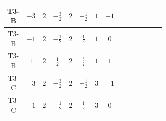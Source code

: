 \documentclass[8pt]{article}
\begin{document}
\begin{landscape}
\begin{longtable}{@{}cccccccc >{\raggedright\arraybackslash}p{0.21\linewidth} >{\raggedright\arraybackslash}p{0.21\linewidth} >{\raggedright\arraybackslash}p{0.21\linewidth}@{}}
\midrule
T3-B & $-3$ & $2$ & $-\frac{3}{2}$ & $2$ & $-\frac{1}{2}$ & $1$ & $-1$ & \scriptsize\adjustbox{max width=\linewidth}{$\begin{gathered} +D_{\mu _1}\left(S_{2,j_1}\right){}^{\dagger } D_{\mu _1}\left(S_{2,j_1}\right)\end{gathered}$} & \scriptsize\adjustbox{max width=\linewidth}{$\begin{gathered} -\frac{\hbar  B_{\mu _1\mu _2}^2}{\epsilon }\end{gathered}$} &  \\
\midrule
T3-B & $-1$ & $2$ & $-\frac{1}{2}$ & $2$ & $\frac{1}{2}$ & $1$ & $0$ & \scriptsize\adjustbox{max width=\linewidth}{$\begin{gathered} +D_{\mu _1}\left(S_{2,j_1}\right){}^{\dagger } D_{\mu _1}\left(S_{2,j_1}\right)\end{gathered}$} &  &  \\
\midrule
T3-B & $1$ & $2$ & $\frac{1}{2}$ & $2$ & $\frac{3}{2}$ & $1$ & $1$ & \scriptsize\adjustbox{max width=\linewidth}{$\begin{gathered} +D_{\mu _1}\left(S_{2,j_1}\right){}^{\dagger } D_{\mu _1}\left(S_{2,j_1}\right)\end{gathered}$} & \scriptsize\adjustbox{max width=\linewidth}{$\begin{gathered} -\frac{\hbar  B_{\mu _1\mu _2}^2}{\epsilon }\end{gathered}$} &  \\
\midrule
T3-C & $-3$ & $2$ & $-\frac{3}{2}$ & $2$ & $-\frac{1}{2}$ & $3$ & $-1$ & \scriptsize\adjustbox{max width=\linewidth}{$\begin{gathered} +D_{\mu _1}\left(S_{2,j_1}\right){}^{\dagger } D_{\mu _1}\left(S_{2,j_1}\right)\end{gathered}$} & \scriptsize\adjustbox{max width=\linewidth}{$\begin{gathered} -\frac{3 \hbar  B_{\mu _1\mu _2}^2}{\epsilon }\end{gathered}$} & \scriptsize\adjustbox{max width=\linewidth}{$\begin{gathered} -\frac{2 \hbar  \left(W_{\mu _1\mu _2}^{A_1}\right){}^2}{\epsilon }\end{gathered}$} \\
\midrule
T3-C & $-1$ & $2$ & $-\frac{1}{2}$ & $2$ & $\frac{1}{2}$ & $3$ & $0$ & \scriptsize\adjustbox{max width=\linewidth}{$\begin{gathered} +D_{\mu _1}\left(S_{2,j_1}\right){}^{\dagger } D_{\mu _1}\left(S_{2,j_1}\right)\end{gathered}$} &  & \scriptsize\adjustbox{max width=\linewidth}{$\begin{gathered} -\frac{\hbar  \left(W_{\mu _1\mu _2}^{A_1}\right){}^2}{\epsilon }\end{gathered}$} \\

\end{longtable}
\end{landscape}
\end{document}
